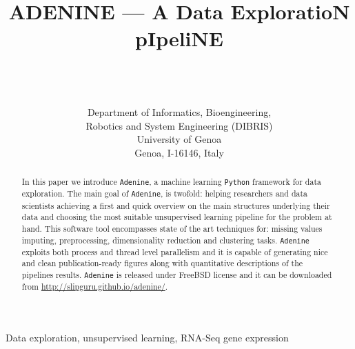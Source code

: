 \documentclass[twoside,11pt]{article}
\makeatletter
\newcommand{\ade}{\texttt{Adenine}\@\xspace}
\newcommand{\py}{\texttt{Python}\@\xspace}
\makeatother
\begin{document}
\title{ADENINE --- A Data ExploratioN pIpeliNE}

\author{ \\
 \\
 \\[1em]
\addr Department of Informatics, Bioengineering, \\Robotics and System Engineering (DIBRIS)\\
     University of Genoa\\
     Genoa, I-16146, Italy}



\maketitle

\begin{abstract}

In this paper we introduce \ade, a machine learning \py framework for data exploration. The main goal of \ade, is twofold: helping researchers and data scientists achieving a first and quick overview on the main structures underlying their data and choosing the most suitable unsupervised learning pipeline for the problem at hand. This software tool encompasses state of the art techniques for: missing values imputing, preprocessing, dimensionality reduction and clustering tasks.
\ade exploits both process and thread level parallelism and it is capable of generating nice and clean publication-ready figures along with quantitative descriptions of the pipelines results. \ade is released under FreeBSD license and it can be downloaded from \href{http://slipguru.github.io/adenine/}{http://slipguru.github.io/adenine/}.

\end{abstract}

\begin{keywords}
Data exploration, unsupervised learning, RNA-Seq gene expression
\end{keywords}
\end{document}
